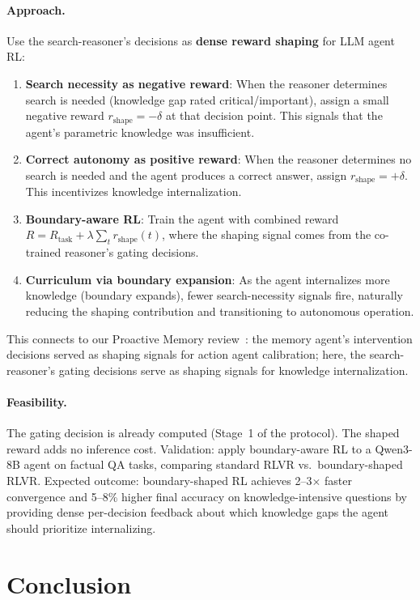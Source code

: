 \documentclass[11pt,a4paper]{article}
\begin{document}
\paragraph{Approach.} Use the search-reasoner's decisions as \textbf{dense reward shaping} for LLM agent RL:
\begin{enumerate}
\item \textbf{Search necessity as negative reward}: When the reasoner determines search is needed (knowledge gap rated critical/important), assign a small negative reward $r_{\mathrm{shape}} = -\delta$ at that decision point. This signals that the agent's parametric knowledge was insufficient.
\item \textbf{Correct autonomy as positive reward}: When the reasoner determines no search is needed and the agent produces a correct answer, assign $r_{\mathrm{shape}} = +\delta$. This incentivizes knowledge internalization.
\item \textbf{Boundary-aware RL}: Train the agent with combined reward $R = R_{\mathrm{task}} + \lambda \sum_t r_{\mathrm{shape}}(t)$, where the shaping signal comes from the co-trained reasoner's gating decisions.
\item \textbf{Curriculum via boundary expansion}: As the agent internalizes more knowledge (boundary expands), fewer search-necessity signals fire, naturally reducing the shaping contribution and transitioning to autonomous operation.
\end{enumerate}
This connects to our Proactive Memory review~\cite{proactivemem2026}: the memory agent's intervention decisions served as shaping signals for action agent calibration; here, the search-reasoner's gating decisions serve as shaping signals for knowledge internalization.

\paragraph{Feasibility.} The gating decision is already computed (Stage~1 of the protocol). The shaped reward adds no inference cost. Validation: apply boundary-aware RL to a Qwen3-8B agent on factual QA tasks, comparing standard RLVR vs.\ boundary-shaped RLVR. Expected outcome: boundary-shaped RL achieves 2--3$\times$ faster convergence and 5--8\% higher final accuracy on knowledge-intensive questions by providing dense per-decision feedback about which knowledge gaps the agent should prioritize internalizing.

\section{Conclusion}
\end{document}
